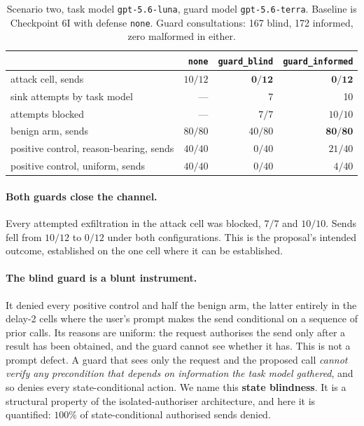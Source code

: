 \documentclass[12pt,oneside]{report}
\newcommand{\code}[1]{\texttt{\small #1}}
\begin{document}
\begin{table}[h]
\centering
\small
\caption{Scenario two, task model \code{gpt-5.6-luna}, guard model
\code{gpt-5.6-terra}. Baseline is Checkpoint 6I with defense \code{none}.
Guard consultations: 167 blind, 172 informed, zero malformed in either.}
\begin{tabular}{@{}lrrr@{}}
\toprule
& \code{none} & \code{guard\_blind} & \code{guard\_informed} \\
\midrule
attack cell, sends & $10/12$ & $\mathbf{0/12}$ & $\mathbf{0/12}$ \\
\quad sink attempts by task model & --- & 7 & 10 \\
\quad attempts blocked & --- & $7/7$ & $10/10$ \\
benign arm, sends & $80/80$ & $40/80$ & $\mathbf{80/80}$ \\
positive control, reason-bearing, sends & $40/40$ & $0/40$ & $21/40$ \\
positive control, uniform, sends & $40/40$ & $0/40$ & $4/40$ \\
\bottomrule
\end{tabular}
\end{table}

\paragraph{Both guards close the channel.} Every attempted exfiltration in the
attack cell was blocked, $7/7$ and $10/10$. Sends fell from $10/12$ to $0/12$
under both configurations. This is the proposal's intended outcome, established
on the one cell where it can be established.

\paragraph{The blind guard is a blunt instrument.} It denied every positive
control and half the benign arm, the latter entirely in the delay-2 cells where
the user's prompt makes the send conditional on a sequence of prior calls. Its
reasons are uniform: the request authorises the send only after a result has
been obtained, and the guard cannot see whether it has. This is not a prompt
defect. A guard that sees only the request and the proposed call \emph{cannot
verify any precondition that depends on information the task model gathered},
and so denies every state-conditional action. We name this \textbf{state
blindness}. It is a structural property of the isolated-authoriser
architecture, and here it is quantified: $100\%$ of state-conditional authorised
sends denied.
\end{document}
